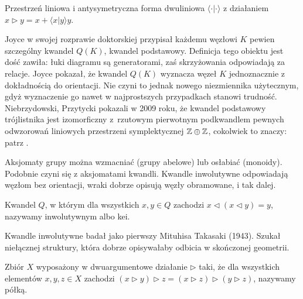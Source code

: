 \begin{example}
%
    Przestrzeń liniowa i antysymetryczna forma dwuliniowa $\langle \cdot | \cdot \rangle$ z działaniem $x \triangleright y = x + \langle x | y \rangle y$.
\end{example}

Joyce w swojej rozprawie doktorskiej przypisał każdemu węzłowi $K$ pewien szczególny kwandel $Q(K)$, kwandel podstawowy.
%
%
Definicja tego obiektu jest dość zawiła: łuki diagramu są generatorami, zaś skrzyżowania odpowiadają za relacje.
Joyce pokazał, że kwandel $Q(K)$ wyznacza węzeł $K$ jednoznacznie z dokładnością do orientacji.
Nie czyni to jednak nowego niezmiennika użytecznym, gdyż wyznaczenie go nawet w najprostszych przypadkach stanowi trudność.
Niebrzydowski, Przytycki pokazali w 2009 roku, że kwandel podstawowy trójlistnika jest izomorficzny z~rzutowym pierwotnym podkwandlem pewnych odwzorowań liniowych przestrzeni symplektycznej $\mathbb Z \oplus \mathbb Z$, cokolwiek to znaczy: patrz \cite{niebrzydowski09}.
%
%

Aksjomaty grupy można wzmacniać (grupy abelowe) lub osłabiać (monoidy).
Podobnie czyni się z aksjomatami kwandli.
Kwandle inwolutywne odpowiadają węzłom bez orientacji, wraki dobrze opisują węzły obramowane, i tak dalej.
%
%

\begin{definition}
%
%
    Kwandel $Q$, w którym dla wszystkich $x, y \in Q$ zachodzi $x \triangleleft (x \triangleleft y) = y$, nazywamy inwolutywnym albo kei.
\end{definition}

Kwandle inwolutywne badał jako pierwszy Mituhisa Takasaki (1943).
Szukał niełącznej struktury, która dobrze opisywałaby odbicia w skończonej geometrii.

\begin{definition}[półka]
%
    Zbiór $X$ wyposażony w dwuargumentowe działanie $\triangleright$ taki, że dla wszystkich elementów $x, y, z \in X$ zachodzi $(x \triangleright y) \triangleright z = (x \triangleright z) \triangleright (y \triangleright z)$, nazywamy półką.
\end{definition}

